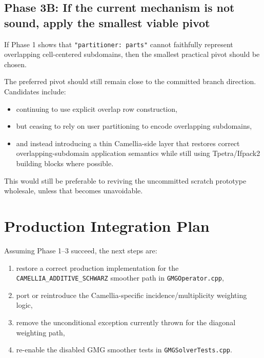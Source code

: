 \documentclass[11pt]{article}
\begin{document}
\subsection{Phase 3B: If the current mechanism is not sound, apply the smallest viable pivot}
If Phase 1 shows that \texttt{"partitioner: parts"} cannot faithfully represent overlapping cell-centered subdomains, then the smallest practical pivot should be chosen.

The preferred pivot should still remain close to the committed branch direction. Candidates include:
\begin{itemize}
  \item continuing to use explicit overlap row construction,
  \item but ceasing to rely on user partitioning to encode overlapping subdomains,
  \item and instead introducing a thin Camellia-side layer that restores correct overlapping-subdomain application semantics while still using Tpetra/Ifpack2 building blocks where possible.
\end{itemize}

This would still be preferable to reviving the uncommitted scratch prototype wholesale, unless that becomes unavoidable.

\section{Production Integration Plan}
Assuming Phase 1--3 succeed, the next steps are:
\begin{enumerate}
  \item restore a correct production implementation for the \texttt{CAMELLIA\_ADDITIVE\_SCHWARZ} smoother path in \texttt{GMGOperator.cpp},
  \item port or reintroduce the Camellia-specific incidence/multiplicity weighting logic,
  \item remove the unconditional exception currently thrown for the diagonal weighting path,
  \item re-enable the disabled GMG smoother tests in \texttt{GMGSolverTests.cpp}.
\end{enumerate}
\end{document}
